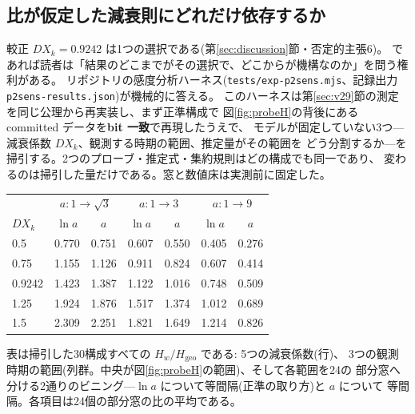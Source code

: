 \documentclass[a4paper,10pt,twocolumn]{ltjsarticle}
\begin{document}
\subsection{比が仮定した減衰則にどれだけ依存するか}
\label{sec:p2sens}

較正 $D X_k=0.9242$ は1つの選択である(第\ref{sec:discussion}節・否定的主張6)。
であれば読者は「結果のどこまでがその選択で、どこからが機構なのか」を問う権利がある。
リポジトリの感度分析ハーネス(\texttt{tests/exp-p2sens.mjs}、記録出力
\texttt{p2sens-results.json})が機械的に答える。
このハーネスは第\ref{sec:v29}節の測定を同じ公理から再実装し、まず正準構成で
図\ref{fig:probeH}の背後にある committed データを\textbf{bit 一致}で再現したうえで、
モデルが固定していない3つ---減衰係数 $D X_k$、観測する時期の範囲、推定量がその範囲を
どう分割するか---を掃引する。2つのプローブ・推定式・集約規則はどの構成でも同一であり、
変わるのは掃引した量だけである。窓と数値床は実測前に固定した。

\begin{center}
{\footnotesize\setlength{\tabcolsep}{4pt}
\begin{tabular}{lcccccc}
 & \multicolumn{2}{c}{$a\colon1\to\sqrt3$}
 & \multicolumn{2}{c}{$a\colon1\to3$}
 & \multicolumn{2}{c}{$a\colon1\to9$} \\
$D X_k$ & $\ln a$ & $a$ & $\ln a$ & $a$ & $\ln a$ & $a$ \\
\hline
0.5 & 0.770 & 0.751 & 0.607 & 0.550 & 0.405 & 0.276 \\
0.75 & 1.155 & 1.126 & 0.911 & 0.824 & 0.607 & 0.414 \\
0.9242 & 1.423 & 1.387 & 1.122 & 1.016 & 0.748 & 0.509 \\
1.25 & 1.924 & 1.876 & 1.517 & 1.374 & 1.012 & 0.689 \\
1.5 & 2.309 & 2.251 & 1.821 & 1.649 & 1.214 & 0.826 \\
\end{tabular}
}
\end{center}

\noindent
表は掃引した30構成すべての $H_w/H_{\mathrm{geo}}$ である: 5つの減衰係数(行)、
3つの観測時期の範囲(列群。中央が図\ref{fig:probeH}の範囲)、そして各範囲を24の
部分窓へ分ける2通りのビニング---$\ln a$ について等間隔(正準の取り方)と $a$ について
等間隔。各項目は24個の部分窓の比の平均である。
\end{document}
